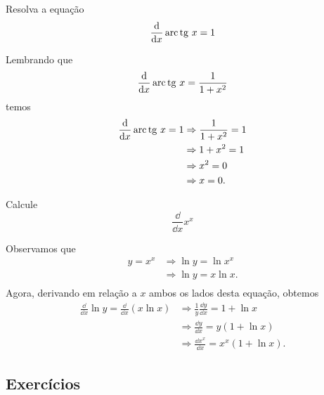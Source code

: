\cleardoublepage\documentclass[../main.tex]{subfiles}
\begin{document}
\begin{exeresol}
  Resolva a equação
  \begin{equation*}
    \frac{\mathrm{d}}{\mathrm{d} x}\operatorname{arc}\operatorname{tg}\, x = 1
  \end{equation*}
\end{exeresol}
\begin{resol}
  Lembrando que
  \begin{equation*}
    \frac{\mathrm{d}}{\mathrm{d} x}\operatorname{arc}\operatorname{tg}\, x = \frac{1}{1+x^2}
  \end{equation*}
  temos
  \begin{align*}
    \frac{\mathrm{d}}{\mathrm{d} x}\operatorname{arc}\operatorname{tg}\, x = 1 &\Rightarrow \frac{1}{1+x^2}=1\\
                                   &\Rightarrow 1+x^2 = 1 \\
                                   &\Rightarrow x^2 = 0 \\
                                   &\Rightarrow x = 0.
  \end{align*}
\end{resol}

\begin{exeresol}
  Calcule
  \begin{equation*}
    \frac{\dd}{\dd x}x^x
  \end{equation*}
\end{exeresol}
\begin{resol}
  Observamos que
  \begin{align*}
    y = x^x &\Rightarrow \ln y = \ln x^x \\
            &\Rightarrow \ln y = x\ln x. \\
  \end{align*}
  Agora, derivando em relação a $x$ ambos os lados desta equação, obtemos
  \begin{align*}
    \frac{\dd}{\dd x}\ln y = \frac{\dd}{\dd x}\left(x\ln x\right) &\Rightarrow \frac{1}{y}\frac{\dd y}{\dd x} = 1 + \ln x \\
                                                                  &\Rightarrow \frac{\dd y}{\dd x} = y(1 + \ln x) \\
                                                                  &\Rightarrow \frac{\dd x^x}{\dd x} = x^x(1 + \ln x).
  \end{align*}
\end{resol}

\subsection{Exercícios}
\end{document}
